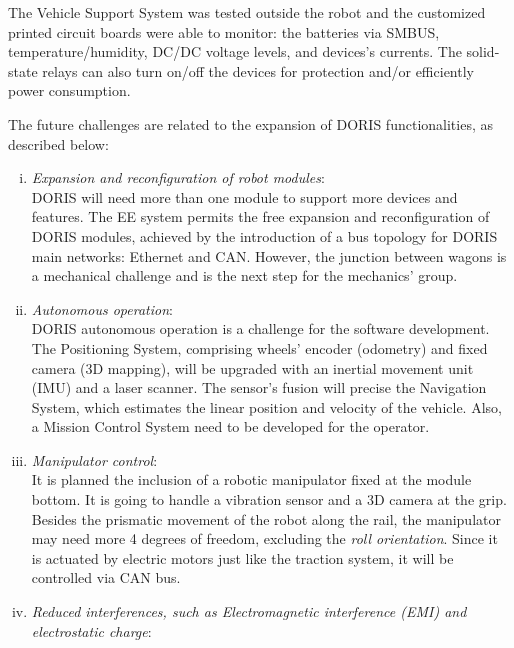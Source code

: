 \documentclass{ifacconf}
\begin{document}
The Vehicle Support System was tested outside the robot and the customized
printed circuit boards were able to monitor: the batteries via SMBUS,
temperature/humidity, DC/DC voltage levels, and devices's currents. The
solid-state relays can also turn on/off the devices for protection and/or
efficiently power consumption.

The future challenges are related to the expansion of DORIS functionalities,
as described below:
\begin{enumerate}[i)]
  \item \emph{Expansion and reconfiguration of robot modules}:\\
  \newline
  DORIS will need more than one module to support more devices and features.
  The EE system permits the free expansion and reconfiguration of DORIS
  modules, achieved by the introduction of a bus topology for DORIS
  main networks: Ethernet and CAN. However, the junction between wagons is a
  mechanical challenge and is the next step for the mechanics' group.\\
  \item \emph{Autonomous operation}:\\
  \newline
  DORIS autonomous operation is a challenge for the software development. The
  Positioning System, comprising wheels' encoder (odometry) and
  fixed camera (3D mapping), will be upgraded with an inertial movement unit
  (IMU) and a laser scanner. The sensor's fusion will precise the Navigation
  System, which estimates the linear position and velocity of the vehicle. Also,
  a Mission Control System need to be developed for the operator.
  \\
  \item \emph{Manipulator control}:\\
  \newline
  It is planned the inclusion of a robotic manipulator fixed at the module
  bottom. It is going to handle a vibration sensor and a 3D camera at the grip.
  Besides the prismatic movement of the robot along the rail, the manipulator
  may need more 4 degrees of freedom, excluding the \emph{roll orientation}.
  Since it is actuated by electric motors just like the traction system, it
  will be controlled via CAN bus.\\
  \item \emph{Reduced interferences, such as Electromagnetic interference (EMI) and electrostatic charge}:\\

\end{enumerate}
\end{document}

